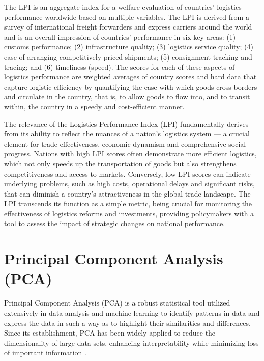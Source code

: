 \documentclass[sigconf]{acmart}
\begin{document}
The LPI is an aggregate index for a welfare evaluation of countries’ logistics performance worldwide based on multiple variables. The LPI is derived from a survey of international freight forwarders and express carriers around the world and is an overall impression of countries’ performance in six key areas: (1) customs performance; (2) infrastructure quality; (3) logistics service quality; (4) ease of arranging competitively priced shipments; (5) consignment tracking and tracing; and (6) timeliness (speed). The scores for each of these aspects of logistics performance are weighted averages of country scores and hard data that capture logistic efficiency by quantifying the ease with which goods cross borders and circulate in the country, that is, to allow goods to flow into, and to transit within, the country in a speedy and cost-efficient manner.

The relevance of the Logistics Performance Index (LPI) fundamentally derives from its ability to reflect the nuances of a nation's logistics system — a crucial element for trade effectiveness, economic dynamism and comprehensive social progress. Nations with high LPI scores often demonstrate more efficient logistics, which not only speeds up the transportation of goods but also strengthens competitiveness and access to markets. Conversely, low LPI scores can indicate underlying problems, such as high costs, operational delays and significant risks, that can diminish a country's attractiveness in the global trade landscape. The LPI transcends its function as a simple metric, being crucial for monitoring the effectiveness of logistics reforms and investments, providing policymakers with a tool to assess the impact of strategic changes on national performance.

\section{Principal Component Analysis (PCA)}

Principal Component Analysis (PCA) is a robust statistical tool utilized extensively in data analysis and machine learning to identify patterns in data and express the data in such a way as to highlight their similarities and differences. Since its establishment, PCA has been widely applied to reduce the dimensionality of large data sets, enhancing interpretability while minimizing loss of important information \cite{jolliffe2016principal, monahan2000nonlinear, takane2001constrained, maroco2018}.
\end{document}
